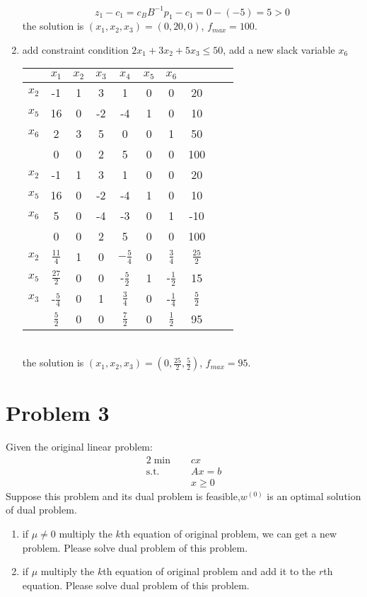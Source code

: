 \documentclass[paper=a4, fontsize=11pt]{scrartcl} %
\numberwithin{equation}{section} %
\numberwithin{figure}{section} %
\numberwithin{table}{section} %
\begin{document}
\begin{enumerate}
\begin{equation}
z_1-c_1=c_BB^{-1}p_1-c_1=0-(-5)=5>0
\end{equation}
the solution is $(x_1,x_2,x_3)=(0,20,0)$, $f_{max}=100$.
\item add constraint condition $2x_1+3x_2+5x_3\leq50$, add a new slack variable $x_6$\\
\begin{tabular}{|c|c|c|c|c|c|c|c|c|c|}
\hline &$x_1$&$x_2$&$x_3$&$x_4$&$x_5$&$x_6$&\\
\hline$x_2$&-1&1&3&1&0&0&20\\
$x_5$&16&0&-2&-4&1&0&10\\
$x_6$&2&3&5&0&0&1&50\\
\hline &0&0&2&5&0&0&100\\
\hline
\hline$x_2$&-1&1&3&1&0&0&20\\
$x_5$&16&0&-2&-4&1&0&10\\
$x_6$&5&0&-4&-3&0&1&-10\\
\hline &0&0&2&5&0&0&100\\
\hline
\hline$x_2$&$\frac{11}{4}$&1&0&$-\frac{5}{4}$&0&$\frac{3}{4}$&$\frac{25}{2}$\\
$x_5$&$\frac{27}{2}$&0&0&-$\frac{5}{2}$&1&-$\frac{1}{2}$&15\\
$x_3$&-$\frac{5}{4}$&0&1&$\frac{3}{4}$&0&-$\frac{1}{4}$&$\frac{5}{2}$\\
\hline &$\frac{5}{2}$&0&0&$\frac{7}{2}$&0&$\frac{1}{2}$&95\\
\hline
\end{tabular}\\
the solution is $(x_1,x_2,x_3)=(0,\frac{25}{2},\frac{5}{2})$, $f_{max}=95$.
\end{enumerate}
\section{Problem 3}
Given the original linear problem:
\begin{alignat}{2}          \nonumber
\min\quad & cx \\    \nonumber
\mbox{s.t.}\quad            \nonumber
& Ax=b\\        \nonumber
& x \geq 0
\end{alignat}
Suppose this problem and its dual problem is feasible,$w^{(0)}$ is an optimal solution of dual problem.
\begin{enumerate}
\item if $\mu\neq0$ multiply the $k$th equation of original problem, we can get a new problem. Please solve dual problem of this problem.
\item if $\mu$ multiply the $k$th equation of original problem and add it to the $r$th equation. Please solve dual problem of this problem.
\end{enumerate}
\end{document}

